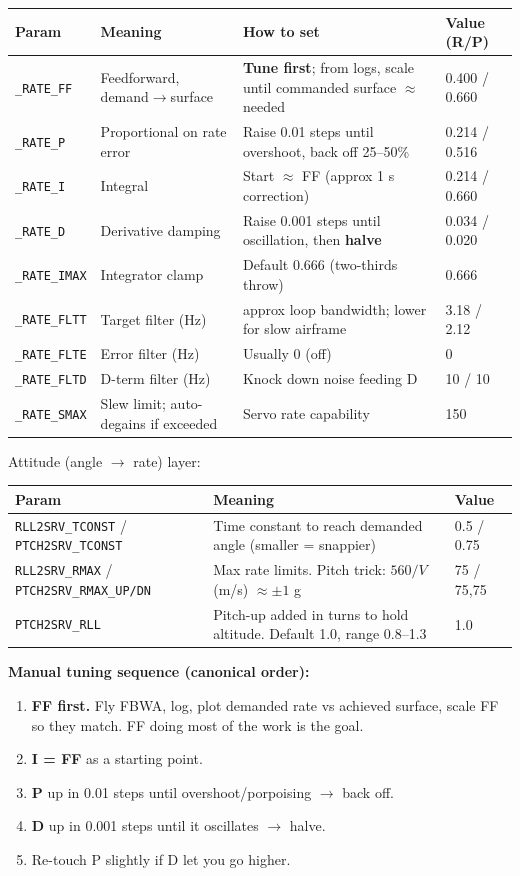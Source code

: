 \documentclass[11pt,a4paper]{article}
\newcommand{\pp}[1]{\texttt{#1}} %
\begin{document}
\begin{longtable}{@{}p{2.7cm}p{4.7cm}p{5.4cm}p{2.4cm}@{}}
\toprule
\textbf{Param} & \textbf{Meaning} & \textbf{How to set} & \textbf{Value (R/P)}\\
\midrule
\endhead
\pp{\_RATE\_FF}   & Feedforward, demand$\rightarrow$surface & \textbf{Tune first}; from logs, scale until commanded surface $\approx$ needed & 0.400 / 0.660\\
\pp{\_RATE\_P}    & Proportional on rate error & Raise 0.01 steps until overshoot, back off 25--50\% & 0.214 / 0.516\\
\pp{\_RATE\_I}    & Integral & Start $\approx$ FF (approx 1 s correction) & 0.214 / 0.660\\
\pp{\_RATE\_D}    & Derivative damping & Raise 0.001 steps until oscillation, then \textbf{halve} & 0.034 / 0.020\\
\pp{\_RATE\_IMAX} & Integrator clamp & Default 0.666 (two-thirds throw) & 0.666\\
\pp{\_RATE\_FLTT} & Target filter (Hz) & approx loop bandwidth; lower for slow airframe & 3.18 / 2.12\\
\pp{\_RATE\_FLTE} & Error filter (Hz) & Usually 0 (off) & 0\\
\pp{\_RATE\_FLTD} & D-term filter (Hz) & Knock down noise feeding D & 10 / 10\\
\pp{\_RATE\_SMAX} & Slew limit; auto-degains if exceeded & Servo rate capability & 150\\
\bottomrule
\end{longtable}

Attitude (angle $\rightarrow$ rate) layer:

\begin{longtable}{@{}p{4.6cm}p{8.7cm}p{2.2cm}@{}}
\toprule
\textbf{Param} & \textbf{Meaning} & \textbf{Value}\\
\midrule
\endhead
\pp{RLL2SRV\_TCONST} / \pp{PTCH2SRV\_TCONST} & Time constant to reach demanded angle (smaller = snappier) & 0.5 / 0.75\\
\pp{RLL2SRV\_RMAX} / \pp{PTCH2SRV\_RMAX\_UP/DN} & Max rate limits. Pitch trick: $560/V$ (m/s) $\approx \pm 1$ g & 75 / 75,75\\
\pp{PTCH2SRV\_RLL} & Pitch-up added in turns to hold altitude. Default 1.0, range 0.8--1.3 & 1.0\\
\bottomrule
\end{longtable}

\textbf{Manual tuning sequence (canonical order):}
\begin{enumerate}[leftmargin=1.6em]
  \item \textbf{FF first.} Fly FBWA, log, plot demanded rate vs achieved surface,
  scale FF so they match. FF doing most of the work is the goal.
  \item \textbf{I = FF} as a starting point.
  \item \textbf{P} up in 0.01 steps until overshoot/porpoising $\rightarrow$ back off.
  \item \textbf{D} up in 0.001 steps until it oscillates $\rightarrow$ halve.
  \item Re-touch P slightly if D let you go higher.
\end{enumerate}
\end{document}
